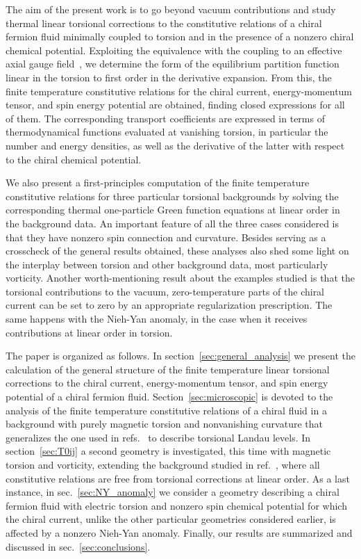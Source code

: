 \documentclass[11pt,a4paper]{article}
\begin{document}
The aim of the present work is to go beyond vacuum contributions 
and study thermal linear torsional corrections to the 
constitutive relations of a chiral fermion fluid minimally coupled to torsion and in the presence of
a nonzero chiral chemical potential. Exploiting the equivalence 
with the coupling to an effective
axial gauge field~\cite{Hehl:1971qi,Datta:1971id}, we determine
the form of the equilibrium partition function linear in the torsion to first order in the 
derivative expansion. 
From this, the finite temperature constitutive relations for the
chiral current, energy-momentum tensor, and spin energy potential are obtained, 
finding closed expressions for
all of them. 
The corresponding transport coefficients are expressed in terms of thermodynamical
functions evaluated at vanishing torsion, in particular the number and energy densities, as well as the 
derivative of the latter with respect to the chiral chemical potential. 

We also present a first-principles
computation of the finite temperature constitutive relations for three particular torsional backgrounds by 
solving the corresponding thermal one-particle Green function equations at linear order in the
background data. An important feature
of all the three cases considered
is that they have nonzero spin connection and curvature.
Besides serving as a crosscheck of the general results obtained, these analyses also shed some light on
the interplay between torsion and other background data, most particularly vorticity. 
Another worth-mentioning result about the examples studied is that the torsional contributions to
the vacuum, zero-temperature parts of the chiral current can be
set to zero by an appropriate regularization prescription. The same happens with the 
Nieh-Yan anomaly, in the case when it receives contributions at linear order in torsion.

The paper is organized as follows. 
In section~\ref{sec:general_analysis} we present the calculation of the general structure of 
the finite temperature
linear torsional corrections to the chiral current, energy-momentum tensor, and spin 
energy potential of a chiral fermion fluid.  
Section~\ref{sec:microscopic} is devoted to the analysis of 
the finite temperature constitutive relations
of a chiral fluid 
in a background with purely magnetic torsion and nonvanishing curvature that 
generalizes the one used in refs.~\cite{Huang:2019haq,Laurila:2020yll} 
to describe torsional Landau levels. In section~\ref{sec:T0ij} a second geometry
is investigated, this time 
with magnetic torsion and vorticity, extending the background studied in
ref.~\cite{Khaidukov:2018oat}, where all constitutive relations
are free from torsional corrections at linear order. 
As a last instance, in sec.~\ref{sec:NY_anomaly} we consider a geometry describing a 
chiral fermion fluid with electric torsion and nonzero spin chemical potential for 
which the chiral current, unlike the other particular geometries considered earlier, is affected by 
a nonzero Nieh-Yan anomaly. 
Finally, our results are summarized and discussed 
in sec.~\ref{sec:conclusions}.
\end{document}
